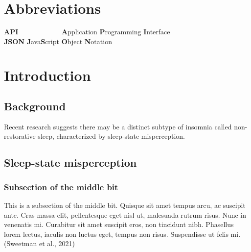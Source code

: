 \documentclass[12pt,a4paper,]{report}
\begin{document}
\newpage


\tableofcontents

\newpage

\listoffigures

\newpage

\chapter*{Abbreviations}\label{abbreviations-1}

\begin{tabbing}
\textbf{API}~~~~~~~~~~~~ \= \textbf{A}pplication \textbf{P}rogramming \textbf{I}nterface \\  
\textbf{JSON} \> \textbf{J}ava\textbf{S}cript \textbf{O}bject \textbf{N}otation \\  
\end{tabbing}

\newpage

\setcounter{page}{1}

\setcounter{page}{1}
\doublespacing
\setlength{\parindent}{0.5in}

\chapter{Introduction}\label{introduction-1}

\section{Background}\label{background-1}

Recent research suggests there may be a distinct subtype of insomnia
called non-restorative sleep, characterized by sleep-state
misperception.

\section{Sleep-state misperception}\label{sleep-state-misperception-1}

\subsection{Subsection of the middle
bit}\label{subsection-of-the-middle-bit-1}

This is a subsection of the middle bit. Quisque sit amet tempus arcu, ac
suscipit ante. Cras massa elit, pellentesque eget nisl ut, malesuada
rutrum risus. Nunc in venenatis mi. Curabitur sit amet suscipit eros,
non tincidunt nibh. Phasellus lorem lectus, iaculis non luctus eget,
tempus non risus. Suspendisse ut felis mi. (Sweetman et al., 2021)
\end{document}
